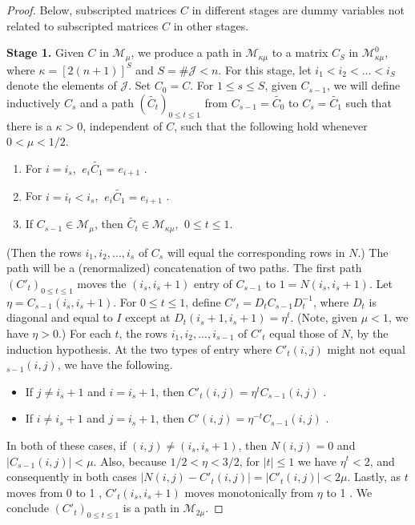 \documentclass{amsart}
\theoremstyle{definition}
\theoremstyle{remark}
\numberwithin{equation}{section}
\begin{document}
{{\begin{proof}
Below,  subscripted matrices $C$ in different 
stages are dummy variables not related to  subscripted matrices $C$
in other stages. 

{\bf Stage 1.} 
 Given $C$ in $\mathcal M_{\mu}$, we produce 
a path in $\mathcal M_{\kappa\mu}$ to a matrix $C_S$
 in $\mathcal M^0_{\kappa\mu}$, where 
$\kappa =[2(n+1)]^S$ and $S=\# \mathcal J<n$. 
For this stage,  
let  $i_1< i_2 < \dots < i_S$  denote the elements of $\mathcal J$. 
Set $C_0=C$. 
For $1\leq s\leq S$, given $C_{s-1}$, 
we will 
define inductively 
$C_s$ and 
a path $(\widetilde{C_t})_{0\leq t \leq 1}$  
from $C_{s-1}=\widetilde{C_0}$ to $C_{s}=\widetilde{C_1}$
such that there is  a $\kappa >0$, independent of 
$C$, such that the following hold whenever  $0<\mu < 1/2$.

\begin{enumerate} 
\item 
For $i=i_s$,  $\ e_i\widetilde{C_1} =e_{i+1}$ . 
\item 
For $i=i_t < i_s$, 
  $\ e_i\widetilde{C_1} =e_{i+1}$ . 
\item 
If $C_{s-1}\in \mathcal M_{\mu}$, then 
$\widetilde{C_t}\in \mathcal M_{\kappa \mu}$, $\ 0\leq t \leq 1$.  
\end{enumerate} 
(Then the rows $i_1,i_2,\dots , i_s$ of $C_s$ will equal 
the corresponding rows in  $N$.) 
The path will be a (renormalized) 
concatenation of two paths. The first 
path $(C'_t)_{0\leq t \leq 1}$  
moves the $(i_s,i_s+1)$ entry of $C_{s-1}$ to $1= N(i_s,i_s+1)$. 
Let $\eta= C_{s-1}(i_s,i_s+1)$. 
For $0\leq t\leq 1$, define 
$C'_t= D_tC_{s-1}D_t^{-1}$, where $D_t$ is diagonal and equal to $I$ except at 
$D_t(i_s + 1, i_s +1) = \eta^t$. (Note, given 
 $\mu < 1$, we have $\eta >0$.) 
For each $t$, the rows $i_1,i_2, ... ,i_{s-1}$ of $C'_t$ equal 
those of $N$, by the induction hypothesis. 
At the two types of entry where $C'_t(i,j)$ might not 
equal $_{s-1}(i,j)$, we have the following.   
\begin{itemize} 
\item 
If $j\neq i_s+1$ and $i=i_s+1$, 
then $C'_t(i,j)=\eta^tC_{s-1}(i,j)$ . 
\item 
If $i\neq i_s+1$ and $j=i_s+1$, then 
$C'(i,j)=\eta^{-t}C_{s-1}(i,j) $ .
\end{itemize} 
In both of these cases, if $(i,j)\neq (i_s,i_s+1)$, then 
$N(i,j)=0$ and $|C_{s-1}(i,j)|<\mu$. 
Also, because $1/2< \eta < 3/2$, 
for $|t|\leq 1$ we have $\eta^t < 2$, 
and consequently in both cases  
$|N(i,j)-C'_t(i,j)|= |C'_t(i,j)|<2\mu$. 
Lastly, as $t$ moves from 0 to 1 , 
$C'_t(i_s,i_s+1)$ moves monotonically from $\eta $ to 1 .  
We conclude $(C'_t)_{0\leq t \leq 1}$ is a path in 
$\mathcal M_{2\mu}$. 



\end{proof}}}
\end{document}
